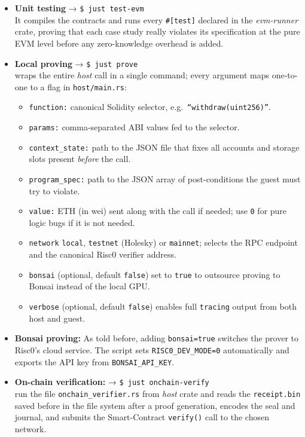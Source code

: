 \begin{itemize}
  \item \textbf{Unit testing} → \texttt{\$ just test-evm} \\
  It compiles the contracts and runs every \texttt{\#[test]} declared in the \textit{evm-runner} crate, proving that each case study really violates its specification at the pure EVM level before any zero-knowledge overhead is added.
  
  \item \textbf{Local proving} → \texttt{\$ just prove}\\
   wraps the entire \textit{host} call in a single command; every argument
      maps one-to-one to a flag in \texttt{host/main.rs}:

      \begin{itemize}
        \item \texttt{function:}   canonical Solidity selector, e.g.\ \texttt{“withdraw(uint256)”}.
        \item \texttt{params:} comma-separated ABI values fed to the selector.
        \item \texttt{context\_state:} path to the JSON file that fixes all accounts and storage slots present \textit{before} the call.
        \item \texttt{program\_spec:} path to the JSON array of post-conditions the guest must try to violate.
        \item \texttt{value:} ETH (in wei) sent along with the call if needed; use \texttt{0} for pure logic bugs if it is not needed.
        \item \texttt{network}   \texttt{local}, \texttt{testnet} (Holesky) or \texttt{mainnet}; selects the RPC endpoint and the canonical Risc0 verifier address.
        \item \texttt{bonsai} (optional, default \texttt{false}) set to \texttt{true} to outsource proving to Bonsai instead of the local GPU.
        \item \texttt{verbose} (optional, default \texttt{false}) enables full \texttt{tracing} output from both host and guest.
      \end{itemize}
  \item \textbf{Bonsai proving:}  
        As told before, adding \texttt{bonsai=true} switches the prover to Risc0’s cloud service.  The script sets \texttt{RISC0\_DEV\_MODE=0} automatically and
        exports the API key from \texttt{BONSAI\_API\_KEY}.
  \item \textbf{On-chain verification:} → \texttt{\$ just onchain-verify } \\
  run the file \texttt{onchain\_verifier.rs} from \textit{host} crate and reads the \allowbreak \texttt{receipt.bin} saved before in the file system after a proof generation, encodes the seal and journal, and submits the Smart-Contract \texttt{verify()} call to the chosen network.
\end{itemize}


